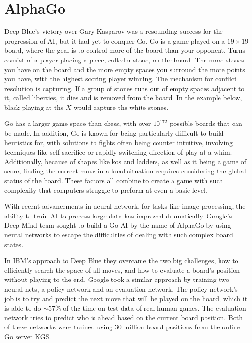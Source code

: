 \documentclass[12pt]{IEEEtran}
\begin{document}
\section{AlphaGo}
\par Deep Blue's victory over Gary Kasparov was a resounding success for the progression of AI, but it had yet to conquer Go. Go is a game played on a $19 \times 19$ board, where the goal is to control more of the board than your opponent. Turns consist of a player placing a piece, called a stone, on the board. The more stones you have on the board and the more empty spaces you surround the more points you have, with the highest scoring player winning. The mechanism for conflict resolution is capturing. If a group of stones runs out of empty spaces adjacent to it, called liberties, it dies and is removed from the board. In the example below, black playing at the $X$ would capture the white stones. 


\largegoban
{}
\showgoban 
\cleargoban

\par Go has a larger game space than chess, with over $10^{172}$ possible boards that can be made. In addition, Go is known for being particularly difficult to build heuristics for, with solutions to fights often being counter intuitive, involving techniques like self sacrifice or rapidly switching direction of play at a whim. Additionally, because of shapes like kos and ladders, as well as it being a game of score, finding the correct move in a local situation requires considering the global status of the board. These factors all combine to create a game with such complexity that computers struggle to preform at even a basic level. 

\par With recent advancements in neural network, for tasks like image processing, the ability to train AI to process large data has improved dramatically. Google's Deep Mind team sought to build a Go AI by the name of AlphaGo by using neural networks to escape the difficulties of dealing with such complex board states. 

\par In IBM's approach to Deep Blue they overcame the two big challenges, how to efficiently search the space of all moves, and how to evaluate a board's position without playing to the end. Google took a similar approach by training two neural nets, a policy network and an evaluation network. The policy network's job is to try and predict the next move that will be played on the board, which it is able to do $\sim 57\%$ of the time on test data of real human games. The evaluation network tries to predict who is ahead based on the current board position. Both of these networks were trained using 30 million board positions from the online Go server KGS.\cite{AlphaGo} 
\end{document}
